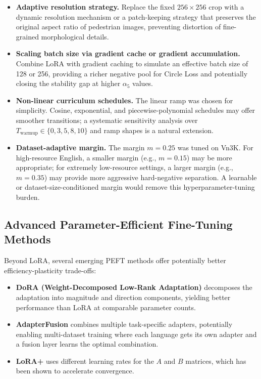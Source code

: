 \documentclass[../main.tex]{subfiles}
\begin{document}
\begin{itemize}
    \item \textbf{Adaptive resolution strategy.} Replace the fixed $256 \times 256$ crop with a dynamic resolution mechanism or a patch-keeping strategy that preserves the original aspect ratio of pedestrian images, preventing distortion of fine-grained morphological details.

    \item \textbf{Scaling batch size via gradient cache or gradient accumulation.} Combine LoRA with gradient caching to simulate an effective batch size of 128 or 256, providing a richer negative pool for Circle Loss and potentially closing the stability gap at higher $\alpha_5$ values.

    \item \textbf{Non-linear curriculum schedules.} The linear ramp was chosen for simplicity. Cosine, exponential, and piecewise-polynomial schedules may offer smoother transitions; a systematic sensitivity analysis over $T_{\text{warmup}} \in \{0, 3, 5, 8, 10\}$ and ramp shapes is a natural extension.

    \item \textbf{Dataset-adaptive margin.} The margin $m{=}0.25$ was tuned on Vn3K. For high-resource English, a smaller margin (e.g., $m{=}0.15$) may be more appropriate; for extremely low-resource settings, a larger margin (e.g., $m{=}0.35$) may provide more aggressive hard-negative separation. A learnable or dataset-size-conditioned margin would remove this hyperparameter-tuning burden.
\end{itemize}

\subsection{Advanced Parameter-Efficient Fine-Tuning Methods}

\noindent Beyond LoRA, several emerging PEFT methods offer potentially better efficiency-plasticity trade-offs:

\begin{itemize}
    \item \textbf{DoRA (Weight-Decomposed Low-Rank Adaptation)} decomposes the adaptation into magnitude and direction components, yielding better performance than LoRA at comparable parameter counts.
    \item \textbf{AdapterFusion} combines multiple task-specific adapters, potentially enabling multi-dataset training where each language gets its own adapter and a fusion layer learns the optimal combination.
    \item \textbf{LoRA+} uses different learning rates for the $A$ and $B$ matrices, which has been shown to accelerate convergence.
\end{itemize}
\end{document}
